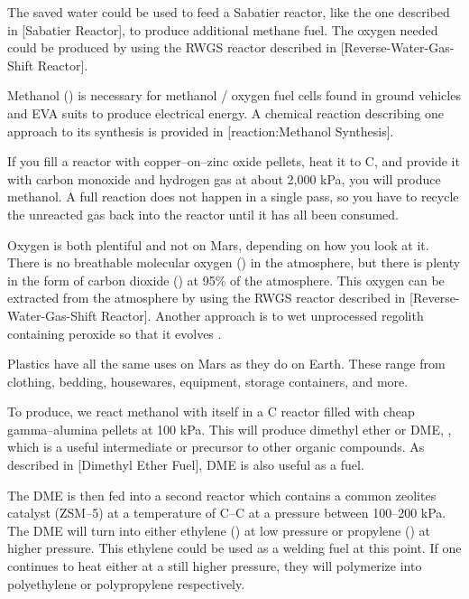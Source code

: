 The saved water could be used to feed a Sabatier reactor, like the one described in [Sabatier Reactor], to produce additional methane fuel. The oxygen needed could be produced by using the RWGS reactor described in [Reverse-Water-Gas-Shift Reactor].

Methanol () is necessary for methanol / oxygen fuel cells found in ground vehicles and EVA suits to produce electrical energy. A chemical reaction describing one approach to its synthesis is provided in [reaction:Methanol Synthesis].

\startformula
{}
\stopformula

If you fill a reactor with copper--on--zinc oxide pellets, heat it to C, and provide it with carbon monoxide and hydrogen gas at about 2,000 kPa, you will produce methanol. A full reaction does not happen in a single pass, so you have to recycle the unreacted gas back into the reactor until it has all been consumed.

Oxygen is both plentiful and not on Mars, depending on how you look at it. There is no breathable molecular oxygen () in the atmosphere, but there is plenty in the form of carbon dioxide () at 95\% of the atmosphere. This oxygen can be extracted from the atmosphere by using the RWGS reactor described in [Reverse-Water-Gas-Shift Reactor]. Another approach is to wet unprocessed regolith containing peroxide so that it evolves .

Plastics have all the same uses on Mars as they do on Earth. These range from clothing, bedding, housewares, equipment, storage containers, and more.

To produce, we react methanol with itself in a C reactor filled with cheap gamma--alumina pellets at 100 kPa. This will produce dimethyl ether or DME, , which is a useful intermediate or precursor to other organic compounds. As described in [Dimethyl Ether Fuel], DME is also useful as a fuel.

The DME is then fed into a second reactor which contains a common zeolites catalyst (ZSM--5) at a temperature of C--C at a pressure between 100--200 kPa. The DME will turn into either ethylene () at low pressure or propylene () at higher pressure. This ethylene could be used as a welding fuel at this point. If one continues to heat either at a still higher pressure, they will polymerize into polyethylene or polypropylene respectively.

